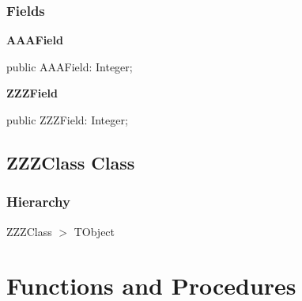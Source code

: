 \documentclass{report}
\newif\ifpdf
\begin{document}
\subsubsection*{\large{\textbf{Fields}}\normalsize\hspace{1ex}\hfill}
\begin{list}{}{
\setlength{\itemindent}{0cm}
\setlength{\listparindent}{0cm}
\setlength{\leftmargin}{\evensidemargin}
\addtolength{\leftmargin}{\tmplength}
\settowidth{\labelsep}{X}
\addtolength{\leftmargin}{\labelsep}
\setlength{\labelwidth}{\tmplength}
}
\label{ok_sorting.TMyRecord-AAAField}
\item[\textbf{AAAField}\hfill]
\ifpdf
\begin{flushleft}
\fi
\begin{ttfamily}
public AAAField: Integer;\end{ttfamily}

\ifpdf
\end{flushleft}
\fi


\par  \label{ok_sorting.TMyRecord-ZZZField}
\item[\textbf{ZZZField}\hfill]
\ifpdf
\begin{flushleft}
\fi
\begin{ttfamily}
public ZZZField: Integer;\end{ttfamily}

\ifpdf
\end{flushleft}
\fi


\par  \end{list}
\ifpdf
\subsection*{\large{\textbf{ZZZClass Class}}\normalsize\hspace{1ex}\hrulefill}
\else
\subsection*{ZZZClass Class}
\fi
\label{ok_sorting.ZZZClass}
\subsubsection*{\large{\textbf{Hierarchy}}\normalsize\hspace{1ex}\hfill}
ZZZClass {$>$} TObject
\section{Functions and Procedures}
\ifpdf
\end{document}
